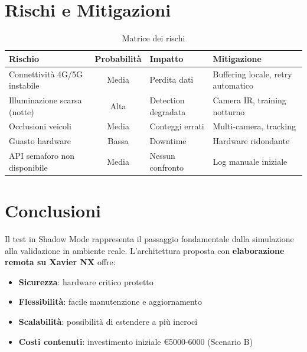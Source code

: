 \documentclass[a4paper,11pt]{article}
\begin{document}
\section{Rischi e Mitigazioni}

\begin{table}[H]
    \centering
    \begin{tabular}{p{4cm}cp{4cm}p{3cm}}
        \toprule
        \textbf{Rischio} & \textbf{Probabilità} & \textbf{Impatto} & \textbf{Mitigazione} \\
        \midrule
        Connettività 4G/5G instabile & Media & Perdita dati & Buffering locale, retry automatico \\
        Illuminazione scarsa (notte) & Alta & Detection degradata & Camera IR, training notturno \\
        Occlusioni veicoli & Media & Conteggi errati & Multi-camera, tracking \\
        Guasto hardware & Bassa & Downtime & Hardware ridondante \\
        API semaforo non disponibile & Media & Nessun confronto & Log manuale iniziale \\
        \bottomrule
    \end{tabular}
    \caption{Matrice dei rischi}
\end{table}

\section{Conclusioni}

Il test in Shadow Mode rappresenta il passaggio fondamentale dalla simulazione alla validazione in ambiente reale. L'architettura proposta con \textbf{elaborazione remota su Xavier NX} offre:

\begin{itemize}
    \item \textbf{Sicurezza}: hardware critico protetto
    \item \textbf{Flessibilità}: facile manutenzione e aggiornamento
    \item \textbf{Scalabilità}: possibilità di estendere a più incroci
    \item \textbf{Costi contenuti}: investimento iniziale €5000-6000 (Scenario B)
\end{itemize}
\end{document}
